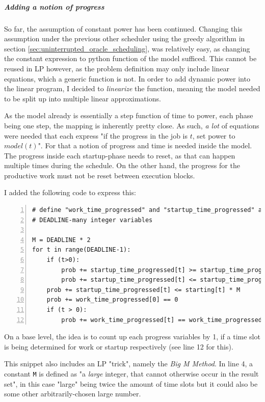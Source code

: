 \subparagraph{Adding a notion of progress}

So far, the assumption of constant power has been continued.
Changing this assumption under the previous other scheduler using the greedy algorithm in section \ref{sec:uninterrupted_oracle_scheduling}, was relatively easy, as changing the constant expression to python function of the model sufficed. 
This cannot be reused in LP however, as the problem definition may only include linear equations, which a generic function is not. 
In order to add dynamic power into the linear program, I decided to \emph{linearize} the function, meaning the model needed to be split up into multiple linear approximations.

As the model already is essentially a step function of time to power, each phase being one step, the mapping is inherently pretty close. 
As such, \emph{a lot} of equations were needed that each express "if the progress in the job is $t$, set power to $model(t)$". 
For that a notion of progress and time is needed inside the model.
The progress inside each startup-phase needs to reset, as that can happen multiple times during the schedule. 
On the other hand, the progress for the productive work must not be reset between execution blocks. 

I added the following code to express this:

\begin{lstlisting}[frame=single, numbers=left, caption={Progress Variables in LP}, label={list:lp_progress}, basicstyle=\ttfamily, breaklines]
# define "work_time_progressed" and "startup_time_progressed" as 
# DEADLINE-many integer variables

M = DEADLINE * 2
for t in range(DEADLINE-1):
    if (t>0):
        prob += startup_time_progressed[t] >= startup_time_progressed[t-1] + 1 - (1 - starting[t]) * M 
        prob += startup_time_progressed[t] <= startup_time_progressed[t-1] + 1 + (1 - starting[t]) * M
    prob += startup_time_progressed[t] <= starting[t] * M 
    prob += work_time_progressed[0] == 0
    if (t > 0):
        prob += work_time_progressed[t] == work_time_progressed[t-1] + work[t]
\end{lstlisting}

On a base level, the idea is to count up each progress variables by 1, if a time slot is being determined for work or startup respectively (see line 12 for this).

This snippet also includes an LP "trick", namely the \emph{Big M Method}. 
In line 4, a constant \verb|M| is defined as "a \emph{large} integer, that cannot otherwise occur in the result set", in this case "large" being twice the amount of time slots but it could also be some other arbitrarily-chosen large number.

